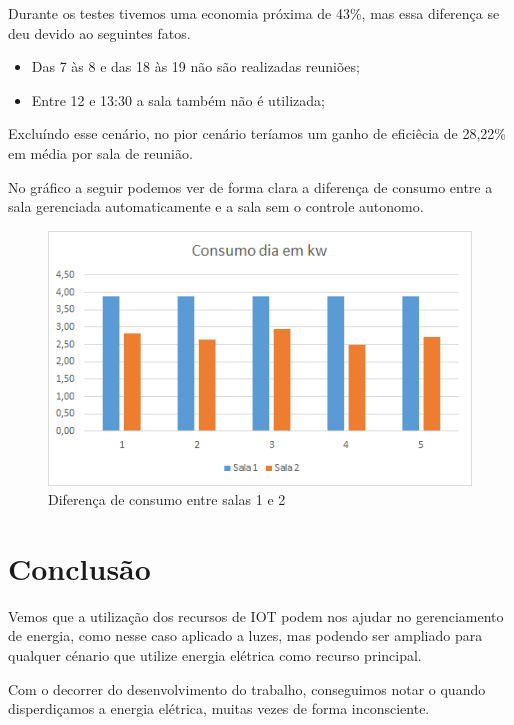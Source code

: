 \documentclass[openright]{normas-utf-tex} %
\begin{document}
Durante os testes tivemos uma economia próxima de 43\%, mas essa diferença se deu devido ao seguintes fatos. 

\begin{itemize}
    \item Das 7 às 8 e das 18 às 19 não são realizadas reuniões;
    \item Entre 12 e 13:30 a sala também não é utilizada;
\end{itemize}

Excluíndo esse cenário, no pior cenário teríamos um ganho de eficiêcia de 28,22\% em média por sala de reunião.

No gráfico a seguir podemos ver de forma clara a diferença de consumo entre a sala gerenciada automaticamente e a sala sem o controle autonomo. 

\begin{figure}[!htb]
     \centering
     \includegraphics[scale=0.8]{g2.png}
     \caption{Diferença de consumo entre salas 1 e 2}
     \label{}
\end{figure}




\chapter{Conclusão}

Vemos que a utilização dos recursos de IOT podem nos ajudar no gerenciamento de energia, como nesse caso aplicado a luzes, mas podendo ser ampliado para qualquer cénario que utilize energia elétrica como recurso principal.

Com o decorrer do desenvolvimento do trabalho, conseguimos notar o quando disperdiçamos a energia elétrica, muitas vezes de forma inconsciente.   
\end{document}
